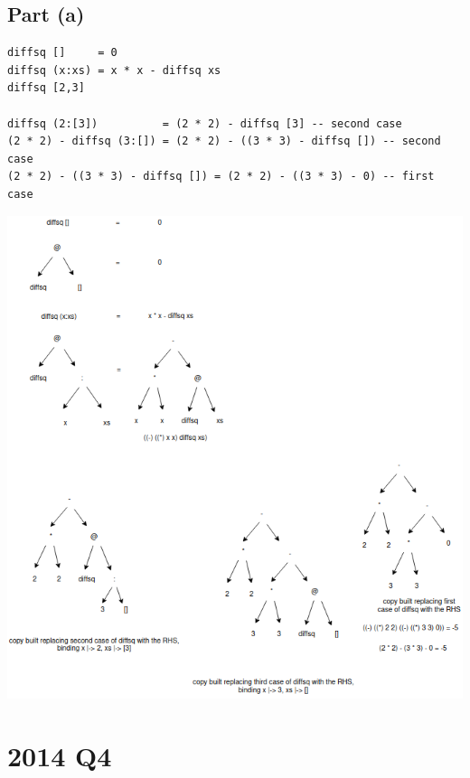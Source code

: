 \documentclass[11pt]{article}
\begin{document}
\subsection{Part (a)}
\label{sec:org783334c}
\begin{verbatim}
diffsq []     = 0
diffsq (x:xs) = x * x - diffsq xs
diffsq [2,3]

diffsq (2:[3])          = (2 * 2) - diffsq [3] -- second case
(2 * 2) - diffsq (3:[]) = (2 * 2) - ((3 * 3) - diffsq []) -- second case
(2 * 2) - ((3 * 3) - diffsq []) = (2 * 2) - ((3 * 3) - 0) -- first case
\end{verbatim}
\begin{center}
\includegraphics[width=160mm]{./diffsq-xs.png}
\end{center}
\section{2014 Q4}
\label{sec:orgd9fe989}
\end{document}
